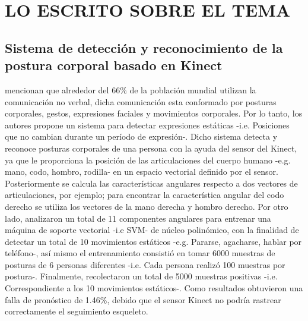 \newpage 
\section{LO ESCRITO SOBRE EL TEMA}
\subsection{Sistema de detecci\'on y reconocimiento de la postura corporal basado en Kinect} \label{tr:1}
 mencionan que alrededor del 66\% de la poblaci\'on mundial  utilizan la comunicaci\'on no verbal, dicha comunicaci\'on esta conformado por posturas corporales, gestos, expresiones faciales y movimientos corporales. Por lo tanto, los autores propone un sistema para detectar expresiones est\'aticas -i.e. Posiciones que no cambian durante un per\'iodo de expresi\'on-.
\medbreak
Dicho sistema detecta y reconoce posturas corporales de una persona con la ayuda del sensor del Kinect, ya que le proporciona la posici\'on de las articulaciones del cuerpo humano -e.g. mano, codo, hombro, rodilla- en un espacio vectorial definido por el sensor. Posteriormente se calcula las caracter\'isticas angulares respecto a dos vectores de articulaciones, por ejemplo; para encontrar la caracter\'istica angular del codo derecho se utiliza los vectores de la mano derecha y hombro derecho.
\medbreak
Por otro lado,  analizaron un total de 11 componentes angulares para entrenar una m\'aquina de soporte vectorial -i.e SVM- de n\'ucleo polin\'omico, con la finalidad de detectar un total de 10 movimientos est\'aticos -e.g. Pararse, agacharse, hablar por tel\'efono-, as\'i mismo el entrenamiento consisti\'o en tomar 6000 muestras de posturas de 6 personas diferentes -i.e. Cada persona realiz\'o 100 muestras por postura-.
\medbreak
Finalmente,  recolectaron un total de 5000 muestras positivas -i.e. Correspondiente a los 10 movimientos est\'aticos-. Como resultados obtuvieron una falla de pron\'ostico de 1.46\%, debido que el sensor Kinect no podr\'ia rastrear correctamente el seguimiento esqueleto.
